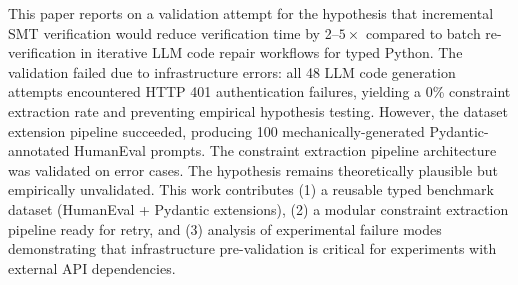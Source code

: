 
This paper reports on a validation attempt for the hypothesis that incremental SMT verification would reduce verification time by 2--$5\times$ compared to batch re-verification in iterative LLM code repair workflows for typed Python. The validation failed due to infrastructure errors: all 48 LLM code generation attempts encountered HTTP 401 authentication failures, yielding a 0\% constraint extraction rate and preventing empirical hypothesis testing. However, the dataset extension pipeline succeeded, producing 100 mechanically-generated Pydantic-annotated HumanEval prompts. The constraint extraction pipeline architecture was validated on error cases. The hypothesis remains theoretically plausible but empirically unvalidated. This work contributes (1) a reusable typed benchmark dataset (HumanEval + Pydantic extensions), (2) a modular constraint extraction pipeline ready for retry, and (3) analysis of experimental failure modes demonstrating that infrastructure pre-validation is critical for experiments with external API dependencies.
